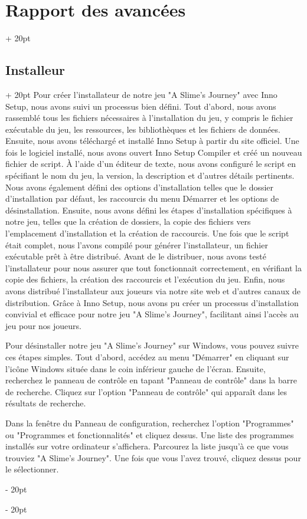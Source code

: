 \documentclass[a4paper, 12pt, twoside]{article}
\newcommand{\ind}[1][20pt]{\advance\leftskip + #1}
\newcommand{\deind}[1][20pt]{\advance\leftskip - #1}
\newenvironment{indt}[2][20pt]{#2 \par \ind[#1]}{\par \deind} %
\begin{document}
\begin{indt}{\section{Rapport des avancées}}
        \begin{indt}{\subsection{Installeur}}
            Pour créer l'installateur de notre jeu "A Slime's Journey" avec Inno Setup, nous avons suivi un processus bien défini. Tout d'abord, nous avons rassemblé tous les fichiers nécessaires à l'installation du jeu, y compris le fichier exécutable du jeu, les ressources, les bibliothèques et les fichiers de données. Ensuite, nous avons téléchargé et installé Inno Setup à partir du site officiel. Une fois le logiciel installé, nous avons ouvert Inno Setup Compiler et créé un nouveau fichier de script. À l'aide d'un éditeur de texte, nous avons configuré le script en spécifiant le nom du jeu, la version, la description et d'autres détails pertinents. Nous avons également défini des options d'installation telles que le dossier d'installation par défaut, les raccourcis du menu Démarrer et les options de désinstallation. Ensuite, nous avons défini les étapes d'installation spécifiques à notre jeu, telles que la création de dossiers, la copie des fichiers vers l'emplacement d'installation et la création de raccourcis. Une fois que le script était complet, nous l'avons compilé pour générer l'installateur, un fichier exécutable prêt à être distribué. Avant de le distribuer, nous avons testé l'installateur pour nous assurer que tout fonctionnait correctement, en vérifiant la copie des fichiers, la création des raccourcis et l'exécution du jeu. Enfin, nous avons distribué l'installateur aux joueurs via notre site web et d'autres canaux de distribution. Grâce à Inno Setup, nous avons pu créer un processus d'installation convivial et efficace pour notre jeu "A Slime's Journey", facilitant ainsi l'accès au jeu pour nos joueurs.

            Pour désinstaller notre jeu "A Slime's Journey" sur Windows, vous pouvez suivre ces étapes simples. Tout d'abord, accédez au menu "Démarrer" en cliquant sur l'icône Windows située dans le coin inférieur gauche de l'écran. Ensuite, recherchez le panneau de contrôle en tapant "Panneau de contrôle" dans la barre de recherche. Cliquez sur l'option "Panneau de contrôle" qui apparaît dans les résultats de recherche.

            Dans la fenêtre du Panneau de configuration, recherchez l'option "Programmes" ou "Programmes et fonctionnalités" et cliquez dessus. Une liste des programmes installés sur votre ordinateur s'affichera. Parcourez la liste jusqu'à ce que vous trouviez "A Slime's Journey". Une fois que vous l'avez trouvé, cliquez dessus pour le sélectionner.


\end{indt}
\end{indt}
\end{document}
